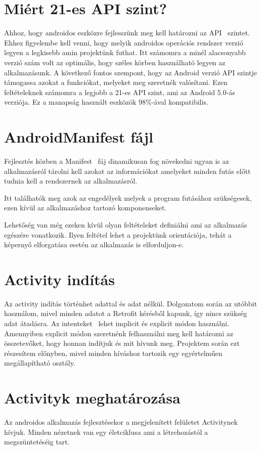 \documentclass[
]{thesis-ekf}
\theoremstyle{definition}
\theoremstyle{remark}
\begin{document}
	\section{Miért 21-es API szint?}
	Ahhoz, hogy androidos eszközre fejlesszünk meg kell határozni az API~\cite{android_api_level} szintet. Ehhez figyelembe kell venni, hogy melyik androidos operációs rendszer verzió legyen a legkisebb amin projektünk futhat. Itt számomra a minél alacsonyabb verzió szám volt az optimális, hogy széles körben használható legyen az alkalmazásunk. A következő fontos szempont, hogy az Android verzió API szintje támogassa azokat a funkciókat, melyeket meg szeretnék valósítani. Ezen feltételeknek számomra a legjobb a 21-es API szint, ami az Android 5.0-ás verziója. Ez a manapság használt eszközök 98\%-ával kompatibilis.
	
	\section{AndroidManifest fájl}
	Fejlesztés közben a Manifest~\cite{android_manifest} fáj dinamikusan fog növekedni ugyan is az alkalmazásról tárolni kell azokat az információkat amelyeket minden futás előtt tudnia kell a rendszernek az alkalmazásról.
	
	Itt találhatók meg azok az engedélyek melyek a program futásához szükségesek, ezen kívül az alkalmazáshoz tartozó komponenseket. 
	
	Lehetőség van még ezeken kívül olyan feltételeket definiálni ami az alkalmazás egészére vonatkozik. Ilyen feltétel lehet a projektünk orientációja, tehát a képernyő elforgatása esetén az alkalmazás is elforduljon-e.
	
	\section{Activity indítás}
	Az activity indítás történhet adattal és adat nélkül. Dolgozatom során az utóbbit használom, mivel minden adatot a Retrofit kérésből kapunk, így nincs szükség adat átadásra. Az intenteket~\cite{android_intent} lehet implicit és explicit módon használni. Amennyiben explicit módon szeretnénk felhasználni meg kell határozni az összetevőket, hogy honnan indítjuk és mit hívunk meg. Projektem során ezt részesítem előnyben, mivel minden híváshoz tartozik egy egyértelműen megállapítható osztály.
	
	\section{Activityk meghatározása}
	Az androidos alkalmazás fejlesztésekor a megjelenített felületet Activitynek hívjuk. Minden nézetnek van egy életciklusa ami a létrehozástól a megszüntetéséig tart.
	
\end{document}
